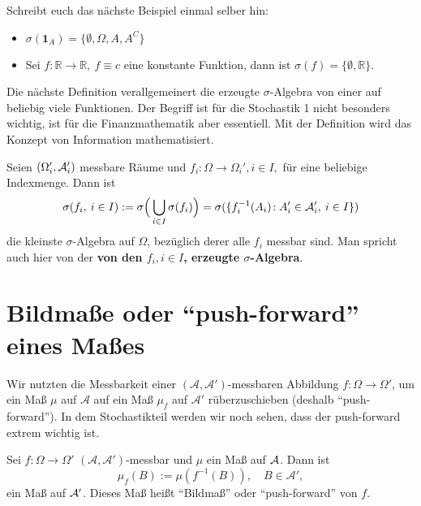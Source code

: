 Schreibt euch das n\"achste Beispiel einmal selber hin:
\begin{beispiel}
\label{yu}\abs
	\begin{itemize}
		\item $\sigma(\mathbf{1}_A) = \{ \emptyset, \Omega, A, A^C \}$
		\item Sei $f \! : \mathbb{R} \rightarrow \mathbb{R}, \: f\equiv c$ eine konstante Funktion, dann ist $\sigma(f) = \{ \emptyset, \mathbb{R} \}$.
	\end{itemize}
\end{beispiel}
Die n\"achste Definition verallgemeinert die erzeugte $\sigma$-Algebra von einer auf beliebig viele Funktionen. Der Begriff ist f\"ur die Stochastik 1 nicht besonders wichtig, ist f\"ur die Finanzmathematik aber essentiell. Mit der Definition wird das Konzept von Information mathematisiert.
\begin{deff}
	Seien $(\Omega_i',\mathcal{A}_i')$ messbare Räume und $f_i \! : \Omega \rightarrow \Omega_i', i \in I,$ f\"ur eine beliebige Indexmenge. Dann ist \[\sigma(f_i, \: i \in I) := \sigma \Big(\bigcup_{i \in I}\sigma(f_i)\Big) = \sigma(\{ f_i^{-1}(A_i) \! : A'_i \in \mathcal{A}'_i, \: i \in I \}) \] die kleinste $\sigma$-Algebra auf $\Omega$, bez\"uglich derer alle $f_i$ messbar sind. Man spricht auch hier von der \textbf{von den $f_i, i\in I$, erzeugte $\sigma$-Algebra}.
\end{deff}

\section{Bildmaße oder \enquote{push-forward} eines Maßes}

Wir nutzten die Messbarkeit einer $(\mathcal A, \mathcal A')$-messbaren Abbildung $f:\Omega\to \Omega'$, um ein Ma\ss{} $\mu$ auf $\mathcal A$ auf ein Ma\ss{} $\mu_f$ auf $\mathcal A'$ r\"uberzuschieben (deshalb \enquote{push-forward}). In dem Stochastikteil werden wir noch sehen, dass der push-forward extrem wichtig ist.

\begin{satz}\label{pushf}
	Sei $f:\Omega \rightarrow \Omega'$ $(\mathcal A, \mathcal A')$-messbar und $\mu$ ein Maß auf $\mathcal{A}$. Dann ist 
	\[ \mu_f(B) := \mu\left(f^{-1}(B)\right),\quad B\in \mathcal A', \] ein Maß auf $\mathcal{A}'$. Dieses Maß heißt \enquote{Bildmaß} oder \enquote{push-forward} von $f$.
\end{satz}

